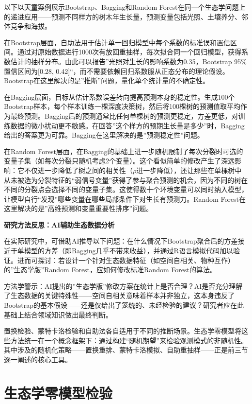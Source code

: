 \documentclass[
  twoside,12pt,fontset=none]{ctexbook}
\renewenvironment{quote}{%
  \def\FrameCommand{{\color{quote-border}\vrule width 4pt}\hspace{10pt}}%
  \MakeFramed {\advance\hsize-\width \FrameRestore\noindent\ignorespaces}%
}{%
  \endMakeFramed
}
\begin{document}
以下以天童案例展示Bootstrap、Bagging和Random Forest在同一个生态学问题上的递进应用------预测不同样方的树木年生长量，预测变量包括光照、土壤养分、邻体竞争和海拔。

在Bootstrap层面，自助法用于估计单一回归模型中每个系数的标准误和置信区间。通过对原始数据进行1000次有放回重抽样，每次拟合同一个回归模型，获得系数估计的抽样分布。由此可以报告''光照对生长的影响系数为0.35，Bootstrap 95\%置信区间为{[}0.28, 0.42{]}``，而不需要依赖回归系数服从正态分布的理论假设。Bootstrap在这里解决的是''推断''问题，量化单个统计量的不确定性。

在Bagging层面，目标从估计系数误差转向提高预测本身的稳定性。生成100个Bootstrap样本，每个样本训练一棵深度决策树，然后将100棵树的预测值取平均作为最终预测。Bagging后的预测通常比任何单棵树的预测更稳定，方差更低，对训练数据的微小扰动更不敏感。在回答''这个样方的预期生长量是多少''时，Bagging给出的答案更为可靠。Bagging在这里解决的是''预测稳定性''问题。

在Random Forest层面，在Bagging的基础上进一步随机限制了每次分裂时可选的变量子集（如每次分裂只随机考虑2个变量）。这个看似简单的修改产生了深远影响：它不仅进一步降低了树之间的相关性（\(\rho\)进一步降低），还让那些在单棵树中从未被选为分裂特征的``弱信号变量''获得了参与聚合预测的机会，因为不同的树在不同的分裂点会选择不同的变量子集。这使得数十个环境变量可以同时纳入模型，让模型自行``发现''哪些变量在哪些局部条件下对生长有预测力。Random Forest在这里解决的是''高维预测和变量重要性排序''问题。

\begin{quote}
\textbf{研究方法反思：AI辅助生态数据分析}

在实际研究中，可借助AI推导以下问题：在什么情况下Bootstrap聚合后的方差接近于单模型的方差（即Bagging几乎不带来收益），并通过R语言模拟代码加以验证。进而可探讨：若设计一个针对生态数据特征（如空间自相关、物种互作）的''生态学版''Random Forest，应如何修改标准Random Forest的算法。

方法学警示：AI提出的''生态学版''修改方案在统计上是否合理？AI是否充分理解了生态数据的关键特殊性------空间自相关意味着样本并非独立，这本身违反了Bootstrap的基本假设------还是仅给出了笼统的、未经检验的建议？研究者应在此基础上结合领域知识做出最终判断。
\end{quote}

置换检验、蒙特卡洛检验和自助法各自适用于不同的推断场景。生态学零模型将这些方法统一在一个概念框架下：通过构建``随机期望''来检验观测模式的非随机性。其中涉及的随机化策略------置换重排、蒙特卡洛模拟、自助重抽样------正是前三节逐一阐述的核心工具。

\hypertarget{ux751fux6001ux5b66ux96f6ux6a21ux578bux68c0ux9a8c}{%
\section{生态学零模型检验}\label{ux751fux6001ux5b66ux96f6ux6a21ux578bux68c0ux9a8c}}
\end{document}
